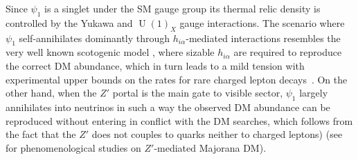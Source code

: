 \documentclass[12pt]{article}
\begin{document}
Since $\psi_{1}$ is a singlet under the SM gauge group its thermal relic density is controlled by the Yukawa and $\operatorname{U}(1)_X$ gauge interactions. 
The scenario where $\psi_{1}$ self-annihilates dominantly through $h_{i\alpha}$-mediated interactions resembles the very well known scotogenic model \cite{Ma:2006km},  
where sizable $h_{i\alpha}$ are required to reproduce the correct DM abundance, which in turn leads to a mild tension with experimental upper bounds on the rates for rare charged lepton decays~\cite{Kubo:2006yx,Sierra:2008wj,Ibarra:2016dlb}. 
On the other hand, when the $Z'$ portal \cite{Langacker:2008yv,Arcadi:2013qia} is the main gate to visible sector, $\psi_1$ largely annihilates into neutrinos in such a way the observed DM abundance can be reproduced without entering in conflict with the DM searches, which follows from the fact that the $Z'$ does not couples to quarks neither to charged leptons)
(see~\cite{Arcadi:2013qia,Alves:2013tqa,Alves:2015pea,Alves:2016cqf,Blanco:2019hah} for phenomenological studies on $Z'$-mediated Majorana DM). 


\end{document}
